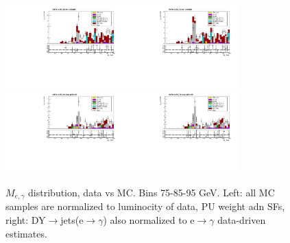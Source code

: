 \begin{figure}[htb]
\begin{center}
    \includegraphics[width=0.40\textwidth]{../figs/figs_v11/ELECTRON_WGamma/PrepareYields/c_TotalDATAvsMC_Barrel__Mpholep1PRELIMINARY_FOR_E_TO_GAMMA_WITH_PSV_CUT_pt85to95_.pdf}\includegraphics[width=0.40\textwidth]{../figs/figs_v11/ELECTRON_WGamma/PrepareYields/c_TotalDATAvsMC_Barrel__Mpholep1PRELIMINARY_FOR_E_TO_GAMMA_WITH_PSV_CUT_pt85to95__etogScale.pdf}\\ 
    \includegraphics[width=0.40\textwidth]{../figs/figs_v11/ELECTRON_WGamma/PrepareYields/c_TotalDATAvsMC_Endcap__Mpholep1PRELIMINARY_FOR_E_TO_GAMMA_WITH_PSV_CUT_pt85to95_.pdf}\includegraphics[width=0.40\textwidth]{../figs/figs_v11/ELECTRON_WGamma/PrepareYields/c_TotalDATAvsMC_Endcap__Mpholep1PRELIMINARY_FOR_E_TO_GAMMA_WITH_PSV_CUT_pt85to95__etogScale.pdf}\\
   \label{fig:Mpholep1DatavsMC_75to500}
  \caption{$M_{e,\gamma}$ distribution, data vs MC. Bins 75-85-95 GeV. Left: all MC samples are normalized to luminocity of data, PU weight adn SFs, right: DY$\rightarrow$jets(e$\rightarrow\gamma$) also normalized to e$\rightarrow\gamma$ data-driven estimates.}
  \end{center}
\end{figure}

